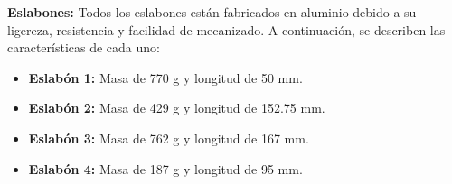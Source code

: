 \textbf{Eslabones:} Todos los eslabones están fabricados en aluminio debido a su ligereza, resistencia y facilidad de mecanizado. A continuación, se describen las características de cada uno:

\begin{itemize}
	\item \textbf{Eslabón 1:} Masa de 770 g y longitud de 50 mm.
	\item \textbf{Eslabón 2:} Masa de 429 g y longitud de 152.75 mm.
	\item \textbf{Eslabón 3:} Masa de 762 g y longitud de 167 mm.
	\item \textbf{Eslabón 4:} Masa de 187 g y longitud de 95 mm.
\end{itemize}


